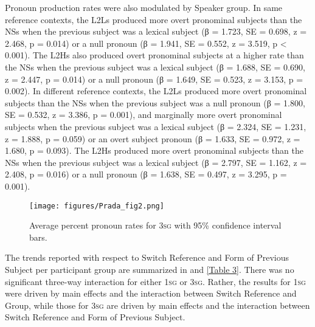 \documentclass[output=paper,colorlinks,citecolor=brown,draftmode]{langscibook}
\begin{document}
Pronoun production rates were also modulated by Speaker group. In same reference contexts, the L2Ls produced more overt pronominal subjects than the NSs when the previous subject was a lexical subject (β = 1.723, SE = 0.698, z = 2.468, p = 0.014) or a null pronoun (β = 1.941, SE = 0.552, z = 3.519, p < 0.001). The L2Hs also produced overt pronominal subjects at a higher rate than the NSs when the previous subject was a lexical subject (β = 1.688, SE = 0.690, z = 2.447, p = 0.014) or a null pronoun (β = 1.649, SE = 0.523, z = 3.153, p = 0.002). In different reference contexts, the L2Ls produced more overt pronominal subjects than the NSs when the previous subject was a null pronoun (β = 1.800, SE = 0.532, z = 3.386, p = 0.001), and marginally more overt pronominal subjects when the previous subject was a lexical subject (β = 2.324, SE = 1.231, z = 1.888, p = 0.059) or an overt subject pronoun (β = 1.633, SE = 0.972, z = 1.680, p = 0.093). The L2Hs produced more overt pronominal subjects than the NSs when the previous subject was a lexical subject (β = 2.797, SE = 1.162, z = 2.408, p = 0.016) or a null pronoun (β = 1.638, SE = 0.497, z = 3.295, p = 0.001).

\begin{figure}
  \caption{Average percent pronoun rates for 3\textsc{sg} with 95\% confidence interval bars.}
  \label{Figure 2}
    \texttt{[image: figures/Prada\_fig2.png]}
\end{figure}

The trends reported with respect to Switch Reference and Form of Previous Subject per participant group are summarized in  and \ref{Table 3}. There was no significant three-way interaction for either 1\textsc{sg} or 3\textsc{sg}. Rather, the results for 1\textsc{sg} were driven by main effects and the interaction between Switch Reference and Group, while those for 3\textsc{sg} are driven by main effects and the interaction between Switch Reference and Form of Previous Subject.
\end{document}
